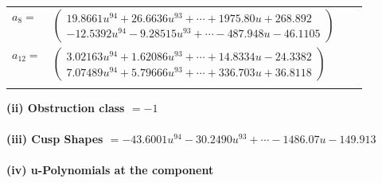 \documentclass[1p]{elsarticle_modified}
\theoremstyle{definition}
\begin{document}
\begin{tabular}{m{7pt} m{180pt} m{7pt} m{180pt} }
\flushright $a_{8}=$&$\begin{pmatrix}19.8661 u^{94}+26.6636 u^{93}+\cdots+1975.80 u+268.892\\-12.5392 u^{94}-9.28515 u^{93}+\cdots-487.948 u-46.1105\end{pmatrix}$ \\
\flushright $a_{12}=$&$\begin{pmatrix}3.02163 u^{94}+1.62086 u^{93}+\cdots+14.8334 u-24.3382\\7.07489 u^{94}+5.79666 u^{93}+\cdots+336.703 u+36.8118\end{pmatrix}$\\&\end{tabular}
\flushleft \textbf{(ii) Obstruction class $= -1$}\\~\\
\flushleft \textbf{(iii) Cusp Shapes $= -43.6001 u^{94}-30.2490 u^{93}+\cdots-1486.07 u-149.913$}\\~\\
\newpage\renewcommand{\arraystretch}{1}
\flushleft \textbf{(iv) u-Polynomials at the component}\newline \\
\end{document}
